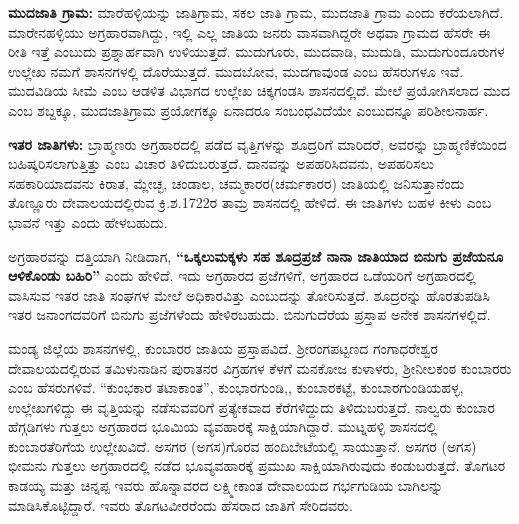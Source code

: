 \textbf{ಮುದಜಾತಿ ಗ್ರಾಮ:} ಮಾರೆಹಳ್ಳಿಯನ್ನು ಜಾತಿಗ್ರಾಮ, ಸಕಲ ಜಾತಿ ಗ್ರಾಮ, ಮುದಜಾತಿ ಗ್ರಾಮ ಎಂದು ಕರೆಯಲಾಗಿದೆ. ಮಾರೇನಹಳ್ಳಿಯು ಅಗ್ರಹಾರವಾಗಿದ್ದು, ಇಲ್ಲಿ ಎಲ್ಲ ಜಾತಿಯ ಜನರು ವಾಸವಾಗಿದ್ದರೇ ಅಥವಾ ಗ್ರಾಮದ ಹೆಸರೇ ಈ ರೀತಿ ಇತ್ತೆ ಎಂಬುದು ಪ್ರಶ್ನಾರ್ಹವಾಗಿ ಉಳಿಯುತ್ತದೆ. ಮುದುಗೂರು, ಮುದವಾಡಿ, ಮುದುಡಿ, ಮುದುಗುಂದೂರುಗಳ ಉಲ್ಲೇಖ ನಮಗೆ ಶಾಸನಗಳಲ್ಲಿ ದೊರೆಯುತ್ತದೆ. ಮುದಬೋವ, ಮುದಗಾವುಂಡ ಎಂಬ ಹೆಸರುಗಳೂ ಇವೆ. ಮುದವಿಡಿಯ ಸೀಮೆ ಎಂಬ ಆಡಳಿತ ವಿಭಾಗದ ಉಲ್ಲೇಖ ಚಿಕ್ಕಗಂಡಸಿ ಶಾಸನದಲ್ಲಿದೆ. ಮೇಲೆ ಪ್ರಯೋಗಿಸಲಾದ ಮುದ ಎಂಬ ಶಬ್ದಕ್ಕೂ, ಮುದಜಾತಿಗ್ರಾಮ ಪ್ರಯೋಗಕ್ಕೂ ಏನಾದರೂ ಸಂಬಂಧವಿದೆಯೇ ಎಂಬುದನ್ನೂ ಪರಿಶೀಲನಾರ್ಹ.

\textbf{ಇತರ ಜಾತಿಗಳು:} ಬ್ರಾಹ್ಮಣರು ಅಗ್ರಹಾರದಲ್ಲಿ ಪಡೆದ ವೃತ್ತಿಗಳನ್ನು ಶೂದ್ರರಿಗೆ ಮಾರಿದರೆ, ಅವರನ್ನು ಬ್ರಾಹ್ಮಣಿಕೆ\-ಯಿಂದ ಬಹಿಷ್ಕರಿಸಲಾಗುತ್ತಿತ್ತು ಎಂಬ ವಿಚಾರ ತಿಳಿದುಬರುತ್ತದೆ. ದಾನವನ್ನು ಅಪಹರಿಸಿದವನು, ಅಪಹರಿಸಲು ಸಹಕಾರಿಯಾದವನು ಕಿರಾತ, ಮ್ಲೇಚ್ಛ, ಚಂಡಾಲ, ಚಮ್ಮಕಾರರ(ಚರ್ಮಕಾರರ) ಜಾತಿಯಲ್ಲಿ ಜನಿಸುತ್ತಾನೆಂದು ತೊಣ್ಣೂರು ದೇವಾಲಯದಲ್ಲಿರುವ ಕ್ರಿ.ಶ.1722ರ ತಾಮ್ರ ಶಾಸನದಲ್ಲಿ ಹೇಳಿದೆ. ಈ ಜಾತಿಗಳು ಬಹಳ ಕೀಳು ಎಂಬ ಭಾವನೆ ಇತ್ತು ಎಂದು ಹೇಳಬಹುದು.

ಅಗ್ರಹಾರವನ್ನು ದತ್ತಿಯಾಗಿ ನೀಡಿದಾಗ, \textbf{“ಒಕ್ಕಲುಮಕ್ಕಳು ಸಹ ಶೂದ್ರಪ್ರಜೆ ನಾನಾ ಜಾತಿಯಾದ ಬಿನುಗು ಪ್ರಜೆಯನೂ ಆಳಿಕೊಂಡು ಬಹಿರಿ”} ಎಂದು ಹೇಳಿದೆ. ಇದು ಅಗ್ರಹಾರದ ಪ್ರಜೆಗಳಿಗೆ, ಅಗ್ರಹಾರದ ಒಡೆಯರಿಗೆ ಅಗ್ರಹಾರದಲ್ಲಿ ವಾಸಿಸುವ ಇತರ ಜಾತಿ ಸಂಘಗಳ ಮೇಲೆ ಅಧಿಕಾರವಿತ್ತು ಎಂಬುದನ್ನು ತೋರಿಸುತ್ತದೆ. ಶೂದ್ರರನ್ನು ಹೊರತುಪಡಿಸಿ ಇತರ ಜನಾಂಗದವರಿಗೆ ಬಿನುಗು ಪ್ರಜೆಗಳೆಂದು ಹೇಳಿರಬಹುದು. ಬಿನುಗುದೆರೆಯ ಪ್ರಸ್ತಾಪ ಅನೇಕ ಶಾಸನಗಳಲ್ಲಿದೆ.

ಮಂಡ್ಯ ಜಿಲ್ಲೆಯ ಶಾಸನಗಳಲ್ಲಿ, ಕುಂಬಾರರ ಜಾತಿಯ ಪ್ರಸ್ತಾಪವಿದೆ. ಶ‍್ರೀರಂಗಪಟ್ಟಣದ ಗಂಗಾಧರೇಶ್ವರ ದೇವಾಲಯದಲ್ಲಿರುವ ತಮಿಳುನಾಡಿನ ಪುರಾತನರ ವಿಗ್ರಹಗಳ ಕೆಳಗೆ ಮನಕೋಜ ಕುಳಾಳರು, ಶ‍್ರೀನೀಲಕಂಠ ಕುಂಬಾರರು ಎಂಬ ಹೆಸರುಗಳಿವೆ. “ಕುಂಭಕಾರ ತಟಾಕಾಂತ”, ಕುಂಭಾರಗುಂಡಿ,, ಕುಂಬಾರಕಟ್ಟೆ, ಕುಂಬಾರಗುಂಡಿಯಹಳ್ಳ, ಉಲ್ಲೇಖಗಳಿದ್ದು ಈ ವೃತ್ತಿಯನ್ನು ನಡೆಸುವವರಿಗೆ ಪ್ರತ್ಯೇಕವಾದ ಕೆರೆಗಳಿದ್ದುದು ತಿಳಿದುಬರುತ್ತದೆ. ನಾಲ್ವರು ಕುಂಬಾರ ಹೆಗ್ಗಡಿಗಳು ಗುತ್ತಲು ಅಗ್ರಹಾರದ ಭೂಮಿಯ ವ್ಯವಹಾರಕ್ಕೆ ಸಾಕ್ಷಿಯಾಗಿದ್ದಾರೆ. ಮುಟ್ನಹಳ್ಳಿ ಶಾಸನದಲ್ಲಿ ಕುಂಬಾರ\break ತೆರಿಗೆಯ ಉಲ್ಲೇಖವಿದೆ. ಅಸಗರ (ಅಗಸ)ಗೊರವ ಹಂದಿಬೇಟೆಯಲ್ಲಿ ಸಾಯುತ್ತಾನೆ. ಅಸಗರ (ಅಗಸ) ಭೀಮನು ಗುತ್ತಲು ಅಗ್ರಹಾರದಲ್ಲಿ ನಡೆದ ಭೂವ್ಯವಹಾರಕ್ಕೆ ಪ್ರಮುಖ ಸಾಕ್ಷಿಯಾಗಿರುವುದು ಕಂಡುಬರುತ್ತದೆ. ತೊಗಟರ ಕಾಡಯ್ಯ ಮತ್ತು ಚಿನ್ನಪ್ಪ ಇವರು ಹೊನ್ನಾವರದ ಲಕ್ಷ್ಮೀಕಾಂತ ದೇವಾಲಯದ ಗರ್ಭಗುಡಿಯ ಬಾಗಿಲನ್ನು ಮಾಡಿಸಿಕೊಟ್ಟಿದ್ದಾರೆ. ಇವರು ತೊಗಟವೀರರೆಂದು ಹೆಸರಾದ ಜಾತಿಗೆ ಸೇರಿದವರು.

